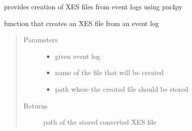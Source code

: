 \documentclass[letterpaper,10pt,english]{sphinxmanual}
\begin{document}
\begin{fulllineitems}
\label{\detokenize{eventLogConverter:eventLogConverter.concreteImplementation.XESFileCreator}}
provides creation of XES files from event logs using pm4py

\begin{fulllineitems}
\label{\detokenize{eventLogConverter:eventLogConverter.concreteImplementation.XESFileCreator.createFile}}
function that creates an XES file from an event log
\begin{quote}\begin{description}
\item[{Parameters}] \leavevmode\begin{itemize}
\item {} 
 \textendash{} given event log

\item {} 
 \textendash{} name of the file that will be created

\item {} 
 \textendash{} path where the created file should be stored

\end{itemize}

\item[{Returns}] \leavevmode
path of the stored converted XES file

\end{description}\end{quote}

\end{fulllineitems}


\end{fulllineitems}

\end{document}
